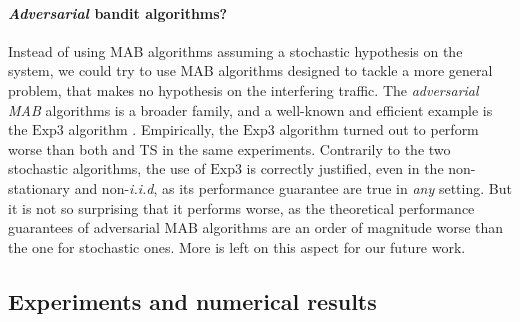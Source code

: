 \paragraph{\emph{Adversarial} bandit algorithms?}
Instead of using MAB algorithms assuming a stochastic hypothesis on the system, we could try to use MAB algorithms designed to tackle a more general problem, that makes no hypothesis on the interfering traffic.
The \emph{adversarial MAB} algorithms is a broader family, and a well-known and efficient example is the $\mathrm{Exp}3$ algorithm \cite{Bubeck12}.
Empirically, the $\mathrm{Exp}3$ algorithm turned out to perform worse than both \UCB{} and TS in the same experiments.
Contrarily to the two stochastic algorithms, the use of $\mathrm{Exp}3$ is correctly justified, even in the non-stationary and non-\emph{i.i.d}, as its performance guarantee are true in \emph{any} setting.
But it is not so surprising that it performs worse, as the theoretical performance guarantees of adversarial MAB algorithms are an order of magnitude
worse than the one for stochastic ones.
More is left on this aspect for our future work.



\subsection{Experiments and numerical results}\label{sub:41:numericalResults}

